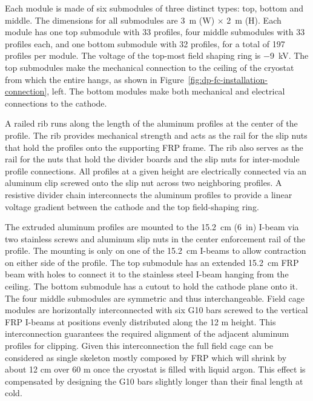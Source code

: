 Each  module is made of six submodules of three distinct types: top, bottom and middle. The dimensions for all submodules are \SI{3}{\m} (W) $\times$ \SI{2}{\m} (H).
Each module has one top submodule with \num{33} profiles, four middle submodules with \num{33} profiles each, and one bottom submodule with \num{32} profiles, for a total of \num{197} profiles per module. The voltage of the top-most field shaping ring  is \SI{-9}{\kV}. 
The top submodules make the mechanical connection to the ceiling of the cryostat from which the entire  hangs, as shown in Figure~\ref{fig:dp-fc-installation-connection}, left. The bottom modules make both mechanical and electrical connections to the cathode. 


A railed rib runs along the length of the aluminum profiles at the center of the profile.  The rib provides mechanical strength and acts as the rail for the slip nuts that hold the profiles onto the supporting FRP frame. The rib also serves as the rail for the nuts that hold the  divider boards and the slip nuts for inter-module profile connections.  
All profiles at a given height are electrically connected via an aluminum clip screwed onto the slip nut across two neighboring profiles.  A resistive divider chain interconnects the aluminum profiles to provide a linear voltage gradient between the cathode and the top field-shaping ring.   


The extruded aluminum profiles are mounted to the \SI{15.2}{\cm} (\SI{6}{in}) I-beam via two stainless screws and aluminum slip nuts in the center enforcement rail of the profile. The mounting is only on one of the \SI{15.2}{\cm} I-beams to allow contraction on either side of the profile. The top submodule has an extended \SI{15.2}{\cm} FRP beam with holes to connect it to the stainless steel I-beam hanging from the ceiling.  The bottom submodule has a cutout to hold the cathode plane onto it. The four middle submodules are symmetric and thus interchangeable.
Field cage modules are horizontally interconnected with six G10 bars screwed to the vertical FRP I-beams at positions evenly distributed along the 12 m height. This interconnection guarantees the required alignment of the adjacent aluminum profiles for clipping. Given this interconnection the full field cage can be considered as single skeleton mostly composed by FRP which will shrink by about 12 cm over 60 m once the cryostat is filled with liquid argon. This effect is compensated by designing the G10 bars slightly longer than their final length at cold.



